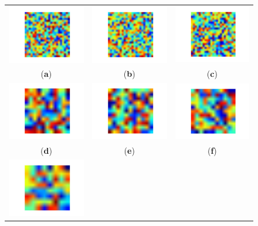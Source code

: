 \begin{figure}[H]
\centering
\begin{tabular}{ccc}
\includegraphics[width=0.2\columnwidth]{images/05-modeling/autoencoder_levels/autoencoders_2_0} &
\includegraphics[width=0.2\columnwidth]{images/05-modeling/autoencoder_levels/autoencoders_2_1} &
\includegraphics[width=0.2\columnwidth]{images/05-modeling/autoencoder_levels/autoencoders_2_2} \\
(\textbf{a}) & (\textbf{b}) & (\textbf{c}) \\
\includegraphics[width=0.2\columnwidth]{images/05-modeling/autoencoder_levels/autoencoders_4_0} &
\includegraphics[width=0.2\columnwidth]{images/05-modeling/autoencoder_levels/autoencoders_4_1} &
\includegraphics[width=0.2\columnwidth]{images/05-modeling/autoencoder_levels/autoencoders_4_2} \\
(\textbf{d}) & (\textbf{e}) & (\textbf{f}) \\
\includegraphics[width=0.2\columnwidth]{images/05-modeling/autoencoder_levels/autoencoders_7_0} &

\end{tabular}
\end{figure}
